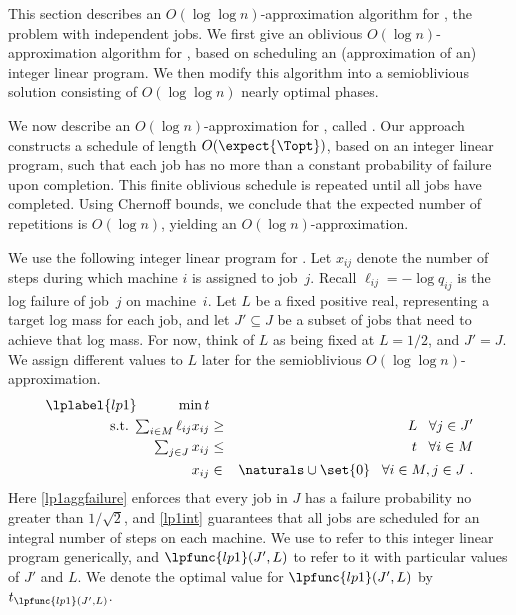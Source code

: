 
This section describes an $O(\log\log{n})$-approximation algorithm for
\suui, the \suu problem with independent jobs.  We first give an
oblivious $O(\log{n})$-approximation algorithm for \suui, based on
scheduling an (approximation of an) integer linear program.  We then
modify this algorithm into a semioblivious solution consisting of
$O(\log\log n)$ nearly optimal phases.  


We now describe an $O(\log{n})$-approximation for \suui, called
\ALGobl. 
Our approach constructs a schedule of length
$O(\expect{\Topt})$, based on an integer linear program, such that each job
has no more than a constant probability of failure upon completion.
This finite oblivious schedule is repeated until all jobs have completed. 
Using Chernoff bounds, we conclude that the expected number of repetitions is 
$O(\log n)$,  yielding an $O(\log n)$-approximation.

We use the following integer linear program for \ALGobl.  Let $x_{ij}$
denote the number of steps during which machine $i$ is assigned to
job~$j$.  Recall $\ell_{ij} = -\log q_{ij}$ is the log failure of
job~$j$ on machine~$i$.  Let $L$ be a fixed positive real,
representing a target log mass for each job, and let $J' \subseteq J$
be a subset of jobs that need to achieve that log mass.  For now,
think of $L$ as being fixed at $L=1/2$, and $J'=J$.  We assign
different values to $L$ later for the semioblivious $O(\log\log
n)$-approximation.
\begin{eqnarray}
  \lplabel{lp1}\hspace{1cm} \min t \nonumber \\ 
  \mbox{s.t. $\sum_{i\in M} \ell_{ij}x_{ij}$} & \geq & L \;\;\; \forall j \in J' \label{eq:lp1aggfailure}\\
  \mbox{$\sum_{j\in J} x_{ij}$} & \leq & t \;\;\; \forall i \in M
  \label{eq:lp1load} \\
  x_{ij} & \in & \naturals\cup\set{0} \;\;\; \forall i\in M, j\in J \label{eq:lp1int}\ .
\end{eqnarray}
Here \eqref{lp1aggfailure} enforces that every
job in $J$ has a failure probability no greater than
$1/\sqrt{2}$, and 
\eqref{lp1int} guarantees that all jobs
are scheduled for an integral number of steps on each machine.
We use  to refer to this integer linear program
generically, and $\lpfunc{lp1}(J',L)$ to refer to it with particular 
values of $J'$ and $L$.  We denote the optimal value for $\lpfunc{lp1}(J',L)$
by $t_{\lpfunc{lp1}(J',L)}$.



